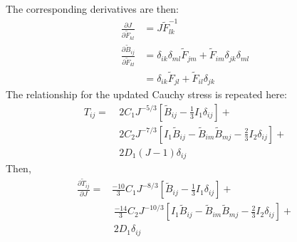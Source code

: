 The corresponding derivatives are then:
\begin{align}
\frac{\partial J}{\partial {\tilde{F}}_{kl}} &= {J}{\tilde{F}}^{-1}_{lk} \\
\frac{\partial \tilde{B}_{ij}}{\partial {\tilde{F}}_{kl}} &= \delta_{ik}\delta_{ml}{\tilde{F}}_{jm} + {\tilde{F}}_{im}\delta_{jk}\delta_{ml} \\
 &=  \delta_{ik}{\tilde{F}}_{jl} + {\tilde{F}}_{il}\delta_{jk}
\end{align}
The relationship for the updated Cauchy stress is repeated here:
\begin{equation}
\begin{aligned}
T_{ij} = &\ 2C_1J^{-5/3}\left[\tilde{B}_{ij} - \frac{1}{3}I_1\delta_{ij}\right] + \\ 
&\ 2C_2J^{-7/3}\left[I_1\tilde{B}_{ij} - \tilde{B}_{im}\tilde{B}_{mj} - \frac{2}{3}I_2\delta_{ij}\right] + \\
&\ 2D_1(J-1)\delta_{ij}
\end{aligned}
\end{equation}
Then,
\begin{equation}
\begin{aligned}
\frac{\partial \tilde{T}_{ij}}{\partial J} = &\frac{-10}{3}C_1J^{-8/3}\left[\tilde{B}_{ij} - \frac{1}{3}I_1\delta_{ij}\right] + \\
&\ \frac{-14}{3}C_2J^{-10/3}\left[I_1\tilde{B}_{ij} - \tilde{B}_{im}\tilde{B}_{mj} - \frac{2}{3}I_2\delta_{ij}\right] + \\ &\ 2D_1\delta_{ij}
\end{aligned}
\end{equation}

